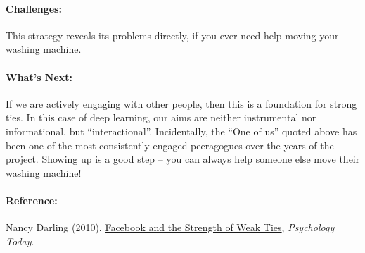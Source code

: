 \paragraph{Challenges:} This strategy reveals its problems directly, if you
ever need help moving your washing machine.

\paragraph{What's Next:} If we are actively engaging with other people,
then this is a foundation for strong ties. In this case of deep
learning, our aims are neither instrumental nor informational, but
``interactional''. Incidentally, the ``One of us'' quoted above has been
one of the most consistently engaged peeragogues over the years of the
project. Showing up is a good step -- you can always help someone else
move their washing machine!

\paragraph{Reference:}

Nancy Darling (2010).
\href{http://www.psychologytoday.com/blog/thinking-about-kids/201005/facebook-and-the-strength-weak-ties}{Facebook
and the Strength of Weak Ties}, \emph{Psychology Today}.
